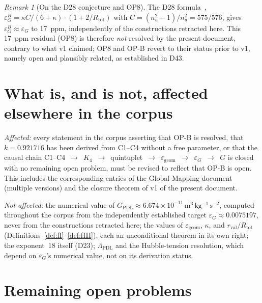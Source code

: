 \documentclass[12pt,a4paper]{article}
\theoremstyle{plain}
\theoremstyle{definition}
\theoremstyle{remark}
\newtheorem{remark}[theorem]{Remark}
\newenvironment{negativebox}[1][]{%
\begin{tcolorbox}[negativestyle,title={Negative Result\ifx\relax#1\relax\else: #1\fi}]}{\end{tcolorbox}}
\newcommand{\Kfour}{K_4}
\newcommand{\kap}{\kappa}
\newcommand{\rval}{r_{\mathrm{val}}}
\newcommand{\Rtot}{R_{\mathrm{tot}}}
\newcommand{\egeom}{\varepsilon_{\mathrm{geom}}}
\newcommand{\eG}{\varepsilon_G}
\newcommand{\eGB}{\varepsilon_G^B}
\begin{document}
\begin{remark}[On the D28 conjecture and OP8]
The D28 formula~\citep{D28}, $\eGB=\kap C/(6+\kap)\cdot(1+2/\Rtot)$ with $C=(n_u^2-1)/n_u^2=575/576$, gives $\eGB\approx\eG$ to 17~ppm, independently of the constructions retracted here. This 17~ppm residual (OP8) is therefore \emph{not} resolved by the present document, contrary to what v1 claimed; OP8 and OP-B revert to their status prior to v1, namely open and plausibly related, as established in D43.
\end{remark}

\section{What is, and is not, affected elsewhere in the corpus}
\label{sec:impact}

\begin{negativebox}[Scope of the retraction]
\emph{Affected:} every statement in the corpus asserting that OP-B is resolved, that $k=0.921716$ has been derived from C1--C4 without a free parameter, or that the causal chain C1--C4~$\to$~$\Kfour$~$\to$~quintuplet~$\to$~$\egeom$~$\to$~$\eG$~$\to$~$G$ is closed with no remaining open problem, must be revised to reflect that OP-B is open. This includes the corresponding entries of the Global Mapping document (multiple versions) and the closure theorem of v1 of the present document.

\emph{Not affected:} the numerical value of $G_{\mathrm{PDL}}\approx6.674\times10^{-11}\,\mathrm{m^3\,kg^{-1}\,s^{-2}}$, computed throughout the corpus from the independently established target $\eG\approx0.0075197$, never from the constructions retracted here; the values of $\egeom$, $\kap$, and $\rval/\Rtot$ (Definitions~\ref{def:fI}--\ref{def:fIII}), each an unconditional theorem in its own right; the exponent~18 itself (D23); $\Lambda_{\mathrm{PDL}}$ and the Hubble-tension resolution, which depend on $\eG$'s numerical value, not on its derivation status.
\end{negativebox}

\section{Remaining open problems}
\label{sec:remaining}
\end{document}
